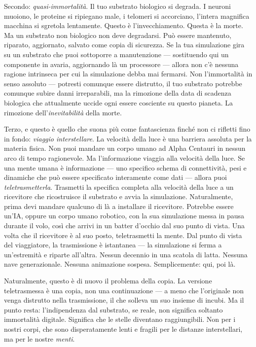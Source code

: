 \documentclass[11pt, twoside, openright]{book}
\begin{document}
Secondo: \textit{quasi-immortalità}. Il tuo substrato biologico si degrada. I neuroni muoiono, le proteine si ripiegano male, i telomeri si accorciano, l'intera magnifica macchina si sgretola lentamente. Questo è l'invecchiamento. Questa è la morte. Ma un substrato non biologico non deve degradarsi. Può essere mantenuto, riparato, aggiornato, salvato come copia di sicurezza. Se la tua simulazione gira su un substrato che puoi sottoporre a manutenzione --- sostituendo qui un componente in avaria, aggiornando là un processore --- allora non c'è nessuna ragione intrinseca per cui la simulazione debba mai fermarsi. Non l'immortalità in senso assoluto --- potresti comunque essere distrutto, il tuo substrato potrebbe comunque subire danni irreparabili, ma la rimozione della data di scadenza biologica che attualmente uccide ogni essere cosciente su questo pianeta. La rimozione dell'\textit{inevitabilità} della morte.

Terzo, e questo è quello che suona più come fantascienza finché non ci rifletti fino in fondo: \textit{viaggio interstellare}. La velocità della luce è una barriera assoluta per la materia fisica. Non puoi mandare un corpo umano ad Alpha Centauri in nessun arco di tempo ragionevole. Ma l'informazione viaggia alla velocità della luce. Se una mente umana è informazione --- uno specifico schema di connettività, pesi e dinamiche che può essere specificato interamente come dati --- allora puoi \textit{teletrasmetterla}. Trasmetti la specifica completa alla velocità della luce a un ricevitore che ricostruisce il substrato e avvia la simulazione. Naturalmente, prima devi mandare qualcuno di là a installare il ricevitore. Potrebbe essere un'IA, oppure un corpo umano robotico, con la sua simulazione messa in pausa durante il volo, così che arrivi in un batter d'occhio dal suo punto di vista. Una volta che il ricevitore è al suo posto, teletrasmetti la mente. Dal punto di vista del viaggiatore, la trasmissione è istantanea --- la simulazione si ferma a un'estremità e riparte all'altra. Nessun decennio in una scatola di latta. Nessuna nave generazionale. Nessuna animazione sospesa. Semplicemente: qui, poi là.

Naturalmente, questo è di nuovo il problema della copia. La versione teletrasmessa è una copia, non una continuazione --- a meno che l'originale non venga distrutto nella trasmissione, il che solleva un suo insieme di incubi. Ma il punto resta: l'indipendenza dal substrato, se reale, non significa soltanto immortalità digitale. Significa che le stelle diventano raggiungibili. Non per i nostri corpi, che sono disperatamente lenti e fragili per le distanze interstellari, ma per le nostre \textit{menti}.
\end{document}
